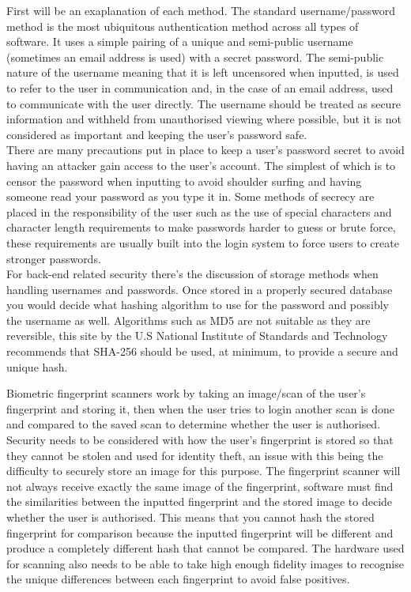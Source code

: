 \documentclass{ueacmpstyle}
\begin{document}
    First will be an exaplanation of each method. The standard username/password method is 
    the most ubiquitous authentication method across all types of software. It uses a simple 
    pairing of a unique and semi-public username (sometimes an email address is used) with a 
    secret password. The semi-public nature of the username meaning that it is left 
    uncensored when inputted, is used to refer to the user in communication and, in 
    the case of an email address, used to communicate with the user directly. The username 
    should be treated as secure information and withheld from unauthorised viewing where 
    possible, but it is not considered as important and keeping the user's password safe. 
    \\
    There are many precautions put in place to keep a user's password secret to avoid having 
    an attacker gain access to the user's account. The simplest of which is to censor the 
    password when inputting to avoid shoulder surfing and having someone read your password 
    as you type it in. Some methods of secrecy are placed in the responsibility of the user 
    such as the use of special characters and character length requirements to make passwords 
    harder to guess or brute force, these requirements are usually built into the login 
    system to force users to create stronger passwords. 
    \\
    For back-end related security there's the discussion of storage methods when handling 
    usernames and passwords. Once stored in a properly secured database you would decide 
    what hashing algorithm to use for the password and possibly the username as well. 
    Algorithms such as MD5 are not suitable as they are reversible, this site \citep{NISTHashFunctions} 
    by the U.S National Institute of Standards and Technology recommends that SHA-256 
    should be used, at minimum, to provide a secure and unique hash. 

    Biometric fingerprint scanners work by taking an image/scan of the user's fingerprint 
    and storing it, then when the user tries to login another scan is done and compared to 
    the saved scan to determine whether the user is authorised. Security needs to be 
    considered with how the user's fingerprint is stored so that they cannot be stolen and 
    used for identity theft, an issue with this being the difficulty to securely store an 
    image for this purpose. The fingerprint scanner will not always receive exactly the 
    same image of the fingerprint, software must find the similarities between the 
    inputted fingerprint and the stored image to decide whether the user is authorised. 
    This means that you cannot hash the stored fingerprint for comparison because the 
    inputted fingerprint will be different and produce a completely different hash that 
    cannot be compared. The hardware used for scanning also needs to be able to take 
    high enough fidelity images to recognise the unique differences between each fingerprint 
    to avoid false positives.
\end{document}
